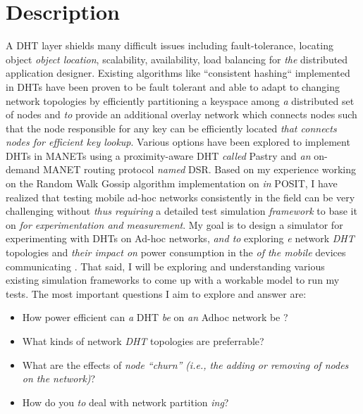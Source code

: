\documentclass[a4paper,10pt]{article}
\newcommand{\cmt}[2]{{\color{red}#1} \emph{\color{green} #2}}
\begin{document}

\section*{Description}
A DHT layer shields many difficult issues including fault-tolerance, \cmt{locating object}{object location}, scalability, availability, load balancing for \cmt{}{the} distributed application designer\cite{Saumitra04howto}. Existing algorithms like ``consistent hashing`` implemented in DHTs have been proven to be fault tolerant and able to adapt to changing network topologies by efficiently partitioning a keyspace among \cmt{}{a} distributed set of nodes \cmt{and}{to} provide an additional overlay network \cmt{which connects nodes such that the node responsible for any key can be efficiently located}{that connects nodes for efficient key lookup}\cite{consistentHashing}. Various options have been explored to implement DHTs in MANETs using a proximity-aware DHT \cmt{}{called} Pastry\cite{Rowstron01pastry:scalable} and \cmt{}{an} on-demand MANET routing protocol \cmt{}{named} DSR\cite{Johnson02dynamicsource}. Based on my experience working on the Random Walk Gossip algorithm implementation \cmt{on}{in} POSIT\cite{positRWG}, I have realized that testing mobile ad-hoc networks consistently in the field can be very challenging \cmt{without}{thus requiring} a detailed \cmt{test}{} simulation \cmt{}{framework} \cmt{to base it on}{for experimentation and measurement}. My goal is to design a simulator for experimenting with DHTs on Ad-hoc networks\cmt{,}{ and to} explor\cmt{ing}{e} \cmt{network}{DHT} topologies and \cmt{}{their impact on} power consumption \cmt{in the}{of the mobile} devices \cmt{communicating}{}. That said, I will be exploring and understanding various existing simulation frameworks to come up with a workable model to run my tests. The most important questions I aim to explore and answer are:
\begin{itemize}
 \item How power efficient can \cmt{}{a} DHT \cmt{}{be} on \cmt{}{an} Adhoc network \cmt{be}{}?
 \item What kinds of \cmt{network}{DHT} topologies are preferrable?
 \item What are the effects of \cmt{}{node ``churn''} \cmt{}{(i.e., the adding or removing of nodes on the network)}?
 \item How \cmt{do you}{to} deal with network partition\cmt{}{ing}?
\end{itemize}
\end{document}
